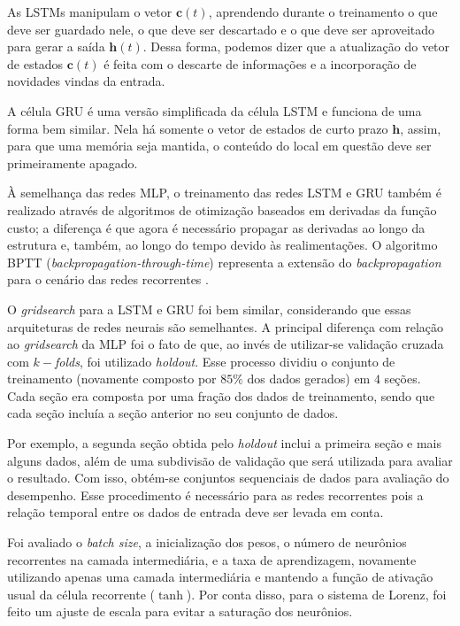 \documentclass{article}
\begin{document}
As LSTMs manipulam o vetor $\mathbf{c}(t)$, aprendendo durante o treinamento o que deve ser guardado nele, o que deve ser descartado e o que deve ser aproveitado para gerar a saída $\mathbf{h}(t)$. Dessa forma, podemos dizer que a atualização do vetor de estados $\mathbf{c}(t)$ é feita com o descarte de informações e a incorporação de novidades vindas da entrada. 

A célula GRU é uma versão simplificada da célula LSTM e funciona de uma forma bem similar. Nela há somente o vetor de estados de curto prazo  $\mathbf{h}$, assim, para que uma memória seja mantida, o conteúdo do local em questão deve ser primeiramente apagado.

À semelhança das redes MLP, o treinamento das redes LSTM e GRU também é realizado através de algoritmos de otimização baseados em derivadas da função custo; a diferença é que agora é necessário propagar as derivadas ao longo da estrutura e, também, ao longo do tempo devido às realimentações. O algoritmo BPTT (\textit{backpropagation-through-time}) representa a extensão do \textit{backpropagation} para o cenário das redes recorrentes \cite{geron2019hands}. 

O \textit{gridsearch} para a LSTM e GRU foi bem similar, considerando que essas arquiteturas de redes neurais são semelhantes. A principal diferença com relação ao \textit{gridsearch} da MLP foi o fato de que, ao invés de utilizar-se validação cruzada com $k-$\textit{folds}, foi utilizado \textit{holdout}. Esse processo dividiu o conjunto de treinamento (novamente composto por $85\%$ dos dados gerados) em $4$ seções. Cada seção era composta por uma fração dos dados de treinamento, sendo que cada seção incluía a seção anterior no seu conjunto de dados.

Por exemplo, a segunda seção obtida pelo \textit{holdout} inclui a primeira seção e mais alguns dados, além de uma subdivisão de validação que será utilizada para avaliar o resultado. Com isso, obtém-se conjuntos sequenciais de dados para avaliação do desempenho. Esse procedimento é necessário para as redes recorrentes pois a relação temporal entre os dados de entrada deve ser levada em conta.

Foi avaliado o \textit{batch size}, a inicialização dos pesos, o número de neurônios recorrentes na camada intermediária, e a taxa de aprendizagem, novamente utilizando apenas uma camada intermediária e mantendo a função de ativação usual da célula recorrente ($\tanh$). Por conta disso, para o sistema de Lorenz, foi feito um ajuste de escala para evitar a saturação dos neurônios.
\end{document}
